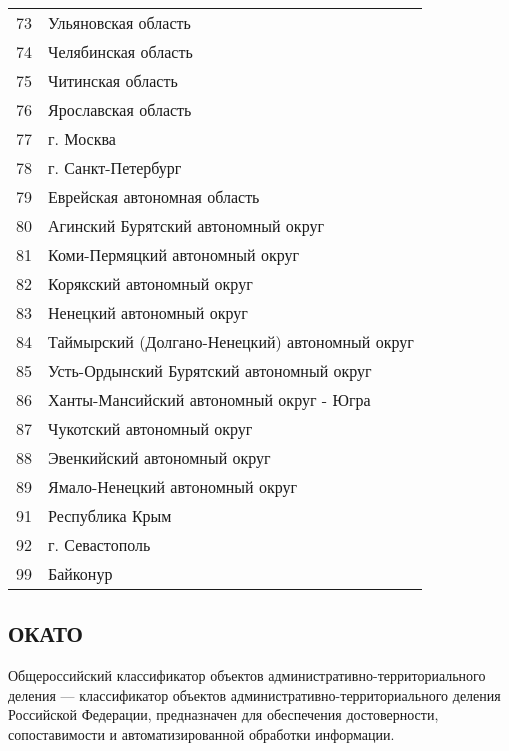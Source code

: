 \documentclass[10pt, a4paper, titlepage]{article}
\begin{document}
\begin{xtabular}{rp{.35\textwidth}}
    73 & Ульяновская область \\
    74 & Челябинская область \\
    75 & Читинская область \\
    76 & Ярославская область \\
    77 & г. Москва \\
    78 & г. Санкт-Петербург \\
    79 & Еврейская автономная область \\
    80 & Агинский Бурятский автономный округ \\
    81 & Коми-Пермяцкий автономный округ \\
    82 & Корякский автономный округ \\
    83 & Ненецкий автономный округ \\
    84 & Таймырский (Долгано-Ненецкий) автономный округ \\
    85 & Усть-Ордынский Бурятский автономный округ \\
    86 & Ханты-Мансийский автономный округ - Югра \\
    87 & Чукотский автономный округ \\
    88 & Эвенкийский автономный округ \\
    89 & Ямало-Ненецкий автономный округ \\
    91 & Республика Крым \\
    92 & г. Севастополь \\
    99 & Байконур \\
\end{xtabular}
\onecolumn

\subsection{ОКАТО}

Общероссийский классификатор объектов административно-территориального деления --- классификатор объектов административно-территориального деления Российской Федерации, предназначен для обеспечения достоверности, сопоставимости и автоматизированной обработки информации.
\end{document}
